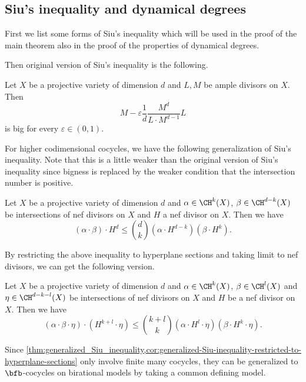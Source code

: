 \subsection{Siu's inequality and dynamical degrees}

First we list some forms of Siu's inequality which will be used in the proof of the main theorem also in the proof of the properties of dynamical degrees.

Then original version of Siu's inequality is the following.
\begin{theorem}\label{thm:Siu_inequality}
	Let $X$ be a projective variety of dimension $d$ and $L,M$ be ample divisors on $X$.
	Then
	\[ M - \varepsilon \frac{1}{d} \frac{M^d}{L \cdot M^{d-1}} L \]
	is big for every $\varepsilon \in (0,1)$.
\end{theorem}

For higher codimensional cocycles, we have the following generalization of Siu's inequality.
Note that this is a little weaker than the original version of Siu's inequality since bigness is replaced by the weaker condition that the intersection number is positive.

\begin{theorem}\label{thm:generalized_Siu_inequality}
	Let $X$ be a projective variety of dimension $d$ and $\alpha \in \CH^k(X)$, $\beta \in \CH^{d-k}(X)$ be intersections of nef divisors on $X$ and $H$ a nef divisor on $X$.
	Then we have
	\[ (\alpha \cdot \beta) \cdot H^{d} \leq \binom{d}{k} (\alpha \cdot H^{d-k}) (\beta \cdot H^{k}). \]
\end{theorem}

By restricting the above inequality to hyperplane sections and taking limit to nef divisors, we can get the following version.

\begin{corollary}\label{cor:generalized-Siu-inequality-restricted-to-hyperplane-sections}
	Let $X$ be a projective variety of dimension $d$ and $\alpha \in \CH^k(X)$, $\beta \in \CH^l(X)$ and
	$\eta \in \CH^{d-k-l}(X)$ be intersections of nef divisors on $X$ and $H$ be a nef divisor on $X$.
	Then we have
	\[ (\alpha \cdot \beta \cdot \eta) \cdot (H^{k+l} \cdot \eta) \leq \binom{k+l}{k} (\alpha \cdot H^{l} \cdot \eta) (\beta \cdot H^{k} \cdot \eta). \]
\end{corollary}

Since \cref{thm:generalized_Siu_inequality,cor:generalized-Siu-inequality-restricted-to-hyperplane-sections} only involve finite many cocycles,
they can be generalized to $\bfb$-cocycles on birational models by taking a common defining model.


